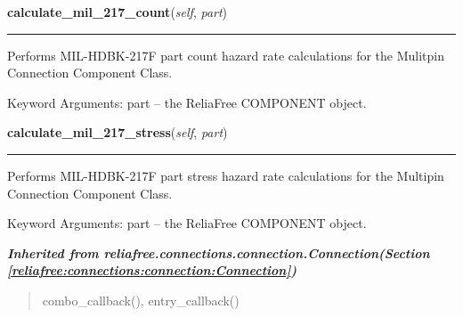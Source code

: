 \hspace{.8\funcindent}\begin{boxedminipage}{\funcwidth}

    \raggedright \textbf{calculate\_mil\_217\_count}(\textit{self}, \textit{part})

    \vspace{-1.5ex}

    \rule{\textwidth}{0.5\fboxrule}
\setlength{\parskip}{2ex}
    Performs MIL-HDBK-217F part count hazard rate calculations for the 
    Mulitpin Connection Component Class.

    Keyword Arguments: part -- the ReliaFree COMPONENT object.

\setlength{\parskip}{1ex}
    \end{boxedminipage}

    \label{reliafree:connections:multipin:Multipin:calculate_mil_217_stress}

    \vspace{0.5ex}

\hspace{.8\funcindent}\begin{boxedminipage}{\funcwidth}

    \raggedright \textbf{calculate\_mil\_217\_stress}(\textit{self}, \textit{part})

    \vspace{-1.5ex}

    \rule{\textwidth}{0.5\fboxrule}
\setlength{\parskip}{2ex}
    Performs MIL-HDBK-217F part stress hazard rate calculations for the 
    Multipin Connection Component Class.

    Keyword Arguments: part -- the ReliaFree COMPONENT object.

\setlength{\parskip}{1ex}
    \end{boxedminipage}


\large{\textbf{\textit{Inherited from reliafree.connections.connection.Connection\textit{(Section \ref{reliafree:connections:connection:Connection})}}}}

\begin{quote}
combo\_callback(), entry\_callback()
\end{quote}
